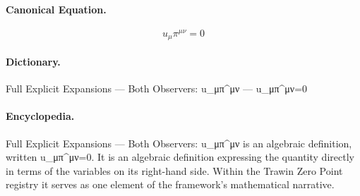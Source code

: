 \paragraph{Canonical Equation.}
\[
u_\mu\pi^{\mu\nu}=0
\]

\paragraph{Dictionary.}
Full Explicit Expansions — Both Observers: u\_μπ\textasciicircum{}μν — u\_μπ\textasciicircum{}μν=0

\paragraph{Encyclopedia.}
Full Explicit Expansions — Both Observers: u\_μπ\textasciicircum{}μν is an algebraic definition, written u\_μπ\textasciicircum{}μν=0. It is an algebraic definition expressing the quantity directly in terms of the variables on its right-hand side. Within the Trawin Zero Point registry it serves as one element of the framework's mathematical narrative.

